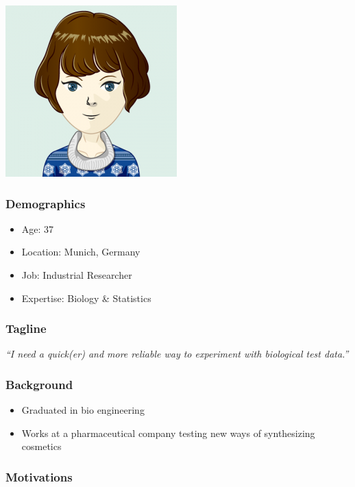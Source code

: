 \includegraphics[scale=0.5]{figures/requirements/persona-avatar-jane}

\subsubsection{Demographics}

\begin{itemize}
    \item Age: 37
    \item Location: Munich, Germany
    \item Job: Industrial Researcher
    \item Expertise: Biology \& Statistics
\end{itemize}

\subsubsection{Tagline}

\textit{``I need a quick(er) and more reliable way to experiment with biological test data.''}

\subsubsection{Background}

\begin{itemize}
    \item Graduated in bio engineering
    \item Works at a pharmaceutical company testing new ways of synthesizing cosmetics
\end{itemize}

\subsubsection{Motivations}

